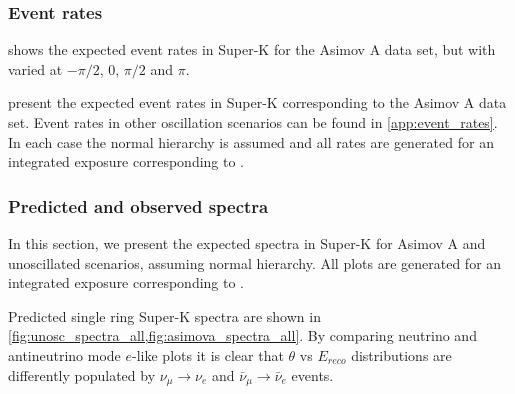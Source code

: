 \subsubsection{Event rates}
\label{sec:event_rates}
 shows the expected event rates in Super-K for the Asimov A data set, but with \deltacp varied at $-\pi/2$, 0, $\pi/2$ and $\pi$.


 present the expected event rates in Super-K corresponding to the Asimov A data set. Event rates in other oscillation scenarios can be found in \cref{app:event_rates}. In each case the normal hierarchy is assumed and all rates are generated for an integrated exposure corresponding to \RunPeriod.







\subsubsection{Predicted and observed spectra}
\label{sec:selection:predicted_spectra}

In this section, we present the expected spectra in Super-K for Asimov A and unoscillated scenarios, assuming normal hierarchy. All plots are generated for an integrated exposure corresponding to \RunPeriod.

Predicted single ring Super-K spectra are shown in \cref{fig:unosc_spectra_all,fig:asimova_spectra_all}. 
By comparing neutrino and antineutrino mode $e$-like plots it is clear that $\theta$ vs $E_{reco}$ distributions are differently populated by $\nu_{\mu} \rightarrow \nu_e$ and $\bar{\nu}_{\mu} \rightarrow \bar{\nu}_e$ events.




